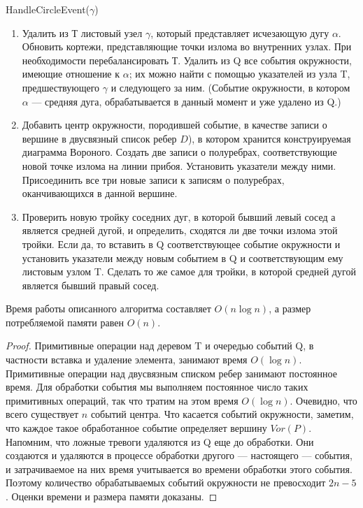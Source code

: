 HandleCircleEvent($\gamma$)

\begin{enumerate}
    \item 	 Удалить  из  Т  листовый  узел  $\gamma$,  который  представляет  исчезающую  дугу  $\alpha$.
    Обновить  кортежи,  представляющие  точки  излома  во  внутренних  узлах.
    При необходимости  перебалансировать  Т.
    Удалить  из  Q  все  события  окружности, имеющие  отношение  к $\alpha$;  их  можно  найти  с  помощью  указателей  из  узла  T, предшествующего $\gamma$ и  следующего  за  ним.  
    (Событие  окружности,  в  котором $\alpha$ --- средняя  дуга,  обрабатывается  в  данный  момент  и  уже  удалено  из  Q.)
    \item 	 Добавить  центр  окружности,  породившей  событие,  в  качестве  записи  о  вершине  в  двусвязный  список  ребер  $D$),  в  котором  хранится  конструируемая  диаграмма  Вороного.
    Создать  две  записи  о  полуребрах,  соответствующие  новой  точке излома  на  линии  прибоя.
    Установить  указатели  между  ними. 
    Присоединить все  три  новые  записи  к  записям  о  полуребрах,  оканчивающихся  в  данной  вершине.
    \item 	 Проверить  новую  тройку  соседних  дуг,  в  которой  бывший  левый  сосед  а  является  средней  дугой,  и  определить,  сходятся  ли  две  точки  излома  этой  тройки. 
    Если  да,  то  вставить  в  Q  соответствующее  событие  окружности  и  установить указатели  между  новым  событием  в  Q  и  соответствующим  ему  листовым  узлом  T.
    Сделать  то  же  самое  для  тройки,  в  которой  средней  дугой  является  бывший  правый  сосед.
\end{enumerate}

\begin{lemma}
    Время  работы  описанного  алгоритма  составляет  $O(n \log n)$,  а  размер  потребляемой  памяти  равен $O(n)$.
\end{lemma}
\begin{proof}
    Примитивные  операции  над  деревом T и  очередью  событий  Q, в  частности  вставка  и  удаление  элемента,  занимают  время  $O(\log n)$.
    Примитивные операции  над  двусвязным  списком  ребер  занимают  постоянное  время.
    Для  обработки  события  мы  выполняем  постоянное  число  таких  примитивных  операций, так  что  тратим  на  этом  время $O(\log n)$.
    Очевидно,  что  всего  существует  $n$  событий центра.
    Что  касается  событий  окружности,  заметим,  что  каждое  такое  обработанное  событие  определяет  вершину  $Vor(P)$.
    Напомним,  что  ложные  тревоги  удаляются  из  Q  еще  до  обработки.
    Они  создаются  и  удаляются  в  процессе  обработки другого --- настоящего --- события,  и  затрачиваемое  на  них  время  учитывается  во времени  обработки  этого  события.  
    Поэтому  количество  обрабатываемых  событий окружности  не  превосходит $2n - 5$.
    Оценки  времени  и  размера  памяти  доказаны.
\end{proof}
